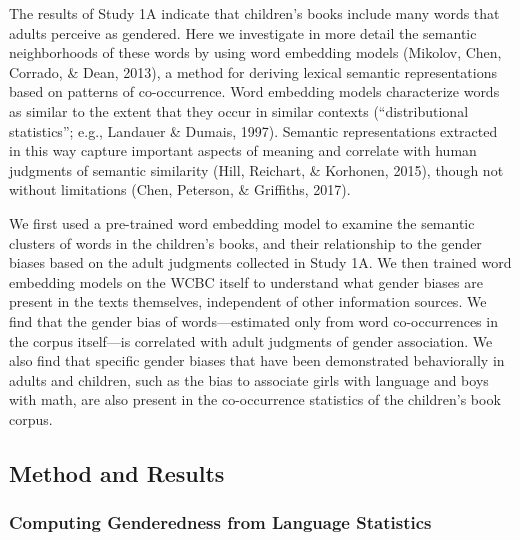 \documentclass[english,,man,floatsintext]{apa6}
\begin{document}
The results of Study 1A indicate that children's books include many words that adults perceive as gendered. Here we investigate in more detail the semantic neighborhoods of these words by using word embedding models (Mikolov, Chen, Corrado, \& Dean, 2013), a method for deriving lexical semantic representations based on patterns of co-occurrence. Word embedding models characterize words as similar to the extent that they occur in similar contexts (``distributional statistics''; e.g., Landauer \& Dumais, 1997). Semantic representations extracted in this way capture important aspects of meaning and correlate with human judgments of semantic similarity (Hill, Reichart, \& Korhonen, 2015), though not without limitations (Chen, Peterson, \& Griffiths, 2017).

We first used a pre-trained word embedding model to examine the semantic clusters of words in the children's books, and their relationship to the gender biases based on the adult judgments collected in Study 1A. We then trained word embedding models on the WCBC itself to understand what gender biases are present in the texts themselves, independent of other information sources. We find that the gender bias of words---estimated only from word co-occurrences in the corpus itself---is correlated with adult judgments of gender association. We also find that specific gender biases that have been demonstrated behaviorally in adults and children, such as the bias to associate girls with language and boys with math, are also present in the co-occurrence statistics of the children's book corpus.

\hypertarget{method-and-results}{%
\subsection{Method and Results}\label{method-and-results}}

\hypertarget{computing-genderedness-from-language-statistics}{%
\subsubsection{Computing Genderedness from Language Statistics}\label{computing-genderedness-from-language-statistics}}
\end{document}
